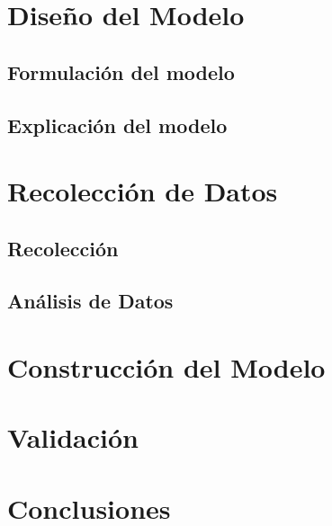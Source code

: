 \documentclass{article}
\begin{document}
\section{Diseño del Modelo}
 
 \subsection{Formulación del modelo}
 \subsection{Explicación del modelo}
 
\section{Recolección de Datos}
 
 \subsection{Recolección}
 \subsection{Análisis de Datos}	
	
\section{Construcción del Modelo}

\section{Validación}

\section{Conclusiones}
	
	
	
	
	
\end{document}
